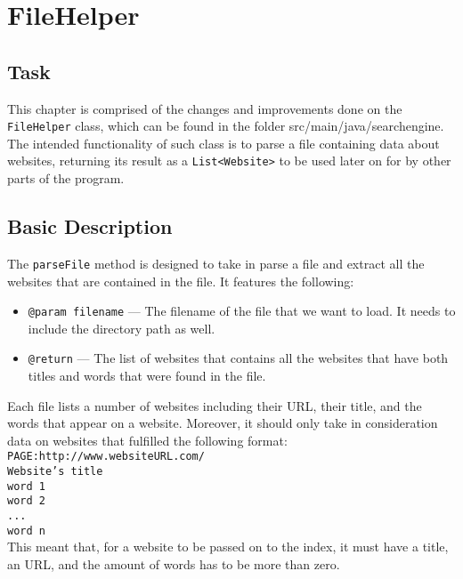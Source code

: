 \chapter{FileHelper}

\section{Task}
This chapter is comprised of the changes and improvements done on the {\tt FileHelper} class, which can be found in the folder src/main/java/searchengine. The intended functionality of such class is to parse a file containing data about websites, returning its result as a {\tt List<Website>} to be used later on for by other parts of the program.

\section{Basic Description}
The {\tt parseFile} method is designed to take in parse a file and extract all the websites that are contained in the file. It features the following:
\begin{itemize}
    \item {\tt @param filename} — The filename of the file that we want to load. It needs to include the directory path as well.
    \item {\tt @return} — The list of websites that contains all the websites that have both titles and words that were found in the file.
\end{itemize}
Each file lists a number of websites including their URL, their title, and the words that appear on a website. Moreover, it should only take in consideration data on websites that fulfilled the following format:\\
{\tt *PAGE:http://www.websiteURL.com/}\\
{\tt Website's title}\\
{\tt word 1}\\
{\tt word 2}\\
{\tt ...}\\
{\tt word n}\\
This meant that, for a website to be passed on to the index, it must have a title, an URL, and the amount of words has to be more than zero.

